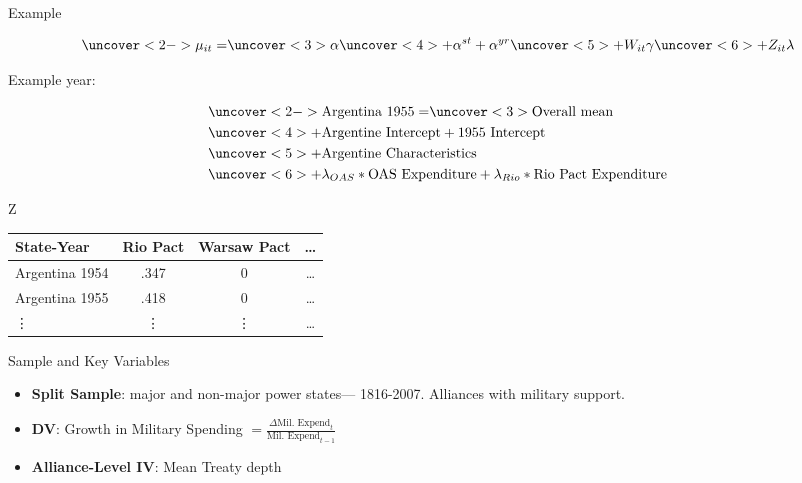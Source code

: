 \documentclass[12pt]{beamer}
\begin{document}
\begin{frame}{Example}


\begin{equation*}
\uncover<2->{\mu_{it} =} \uncover<3>{\alpha} \uncover<4>{+ \alpha^{st} + \alpha^{yr}} \uncover<5>{+ W_{it} \gamma} \uncover<6>{+ Z_{it} \lambda}
\end{equation*}

Example year: 

\begin{equation*}
\begin{split}
& \uncover<2->{\mbox{Argentina 1955} = } \uncover<3>{\mbox{Overall mean}} \\
& \uncover<4>{+ \mbox{Argentine Intercept} + \mbox{1955 Intercept}} \\
& \uncover<5>{+ \mbox{Argentine Characteristics}} \\
& \uncover<6>{+ \lambda_{OAS} * \mbox{OAS Expenditure} + \lambda_{Rio} * \mbox{Rio Pact Expenditure}}
\end{split}
\end{equation*}



\end{frame}




\begin{frame}[standout]{Z} 

\begin{tabular}{lccc}
State-Year & Rio Pact & Warsaw Pact & \ldots \\
\hline
Argentina 1954 & .347 & 0 & \ldots \\
Argentina 1955 & .418  & 0 & \ldots  \\
 \vdots & \vdots & \vdots & \ldots  
\end{tabular}

 \end{frame}




\begin{frame}{Sample and Key Variables}

\begin{itemize}
\item \textbf{Split Sample}: major and non-major power states--- 1816-2007. Alliances with military support. 
\pause
\item \textbf{DV}: Growth in Military Spending $ = \frac{ \Delta \mbox{Mil. Expend}_t }{ \mbox{Mil. Expend}_{t-1} }$ 
\pause
\item \textbf{Alliance-Level IV}: Mean Treaty depth
\end{itemize} 

\end{frame}
\end{document}
